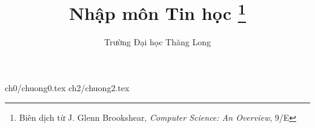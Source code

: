 \documentclass[12pt]{book}%
\title{Nhập môn Tin học \thanks{Biên dịch từ J. Glenn Brookshear, \textit{Computer
    Science: An Overview}, 9/E}}
\author{Trường Đại học Thăng Long}
\begin{document}
\maketitle

\dominitoc[e]

\tableofcontents
  
  
 {ch0/chuong0.tex}
 {ch2/chuong2.tex}

        

  
 


\appendix
 

   
  
\end{document}

